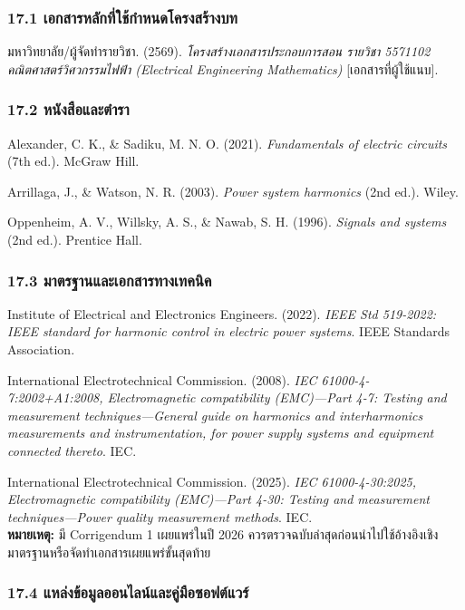 \begin{raggedright}

\subsubsection{17.1 เอกสารหลักที่ใช้กำหนดโครงสร้างบท}

มหาวิทยาลัย/ผู้จัดทำรายวิชา. (2569). \textit{โครงสร้างเอกสารประกอบการสอน รายวิชา 5571102 คณิตศาสตร์วิศวกรรมไฟฟ้า (Electrical Engineering Mathematics)} [เอกสารที่ผู้ใช้แนบ].

\subsubsection{17.2 หนังสือและตำรา}

Alexander, C. K., \& Sadiku, M. N. O. (2021). \textit{Fundamentals of electric circuits} (7th ed.). McGraw Hill.

Arrillaga, J., \& Watson, N. R. (2003). \textit{Power system harmonics} (2nd ed.). Wiley.

Oppenheim, A. V., Willsky, A. S., \& Nawab, S. H. (1996). \textit{Signals and systems} (2nd ed.). Prentice Hall.

\subsubsection{17.3 มาตรฐานและเอกสารทางเทคนิค}

Institute of Electrical and Electronics Engineers. (2022). \textit{IEEE Std 519-2022: IEEE standard for harmonic control in electric power systems}. IEEE Standards Association.

International Electrotechnical Commission. (2008). \textit{IEC 61000-4-7:2002+A1:2008, Electromagnetic compatibility (EMC)—Part 4-7: Testing and measurement techniques—General guide on harmonics and interharmonics measurements and instrumentation, for power supply systems and equipment connected thereto}. IEC.

International Electrotechnical Commission. (2025). \textit{IEC 61000-4-30:2025, Electromagnetic compatibility (EMC)—Part 4-30: Testing and measurement techniques—Power quality measurement methods}. IEC. \\
\textbf{หมายเหตุ:} มี Corrigendum 1 เผยแพร่ในปี 2026 ควรตรวจฉบับล่าสุดก่อนนำไปใช้อ้างอิงเชิงมาตรฐานหรือจัดทำเอกสารเผยแพร่ขั้นสุดท้าย

\subsubsection{17.4 แหล่งข้อมูลออนไลน์และคู่มือซอฟต์แวร์}


\end{raggedright}
